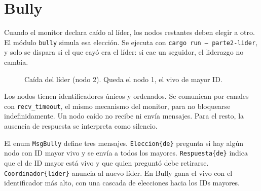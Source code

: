 \section{Bully}

Cuando el monitor declara caído al líder, los nodos restantes deben
elegir a otro. El módulo \texttt{bully} simula esa elección. Se ejecuta
con \texttt{cargo run -- parte2-lider}, y solo se dispara si el que cayó
era el líder: si cae un seguidor, el liderazgo no cambia.

\begin{figure}[H]
\centering
{}
\caption{Caída del líder (nodo 2). Queda el nodo 1, el vivo de mayor ID.}
\label{fig:bully-secuencia}
\end{figure}

Los nodos tienen identificadores únicos y ordenados. Se comunican por
canales con \texttt{recv\_timeout}, el mismo mecanismo del monitor, para
no bloquearse indefinidamente. Un nodo caído no recibe ni envía mensajes.
Para el resto, la ausencia de respuesta se interpreta como silencio.

El enum \texttt{MsgBully} define tres mensajes. \texttt{Eleccion\{de\}}
pregunta si hay algún nodo con ID mayor vivo y se envía a todos los
mayores. \texttt{Respuesta\{de\}} indica que el de ID mayor está vivo y
que quien preguntó debe retirarse. \texttt{Coordinador\{lider\}} anuncia
al nuevo líder. En Bully gana el vivo con el identificador más alto, con
una cascada de elecciones hacia los IDs mayores.

